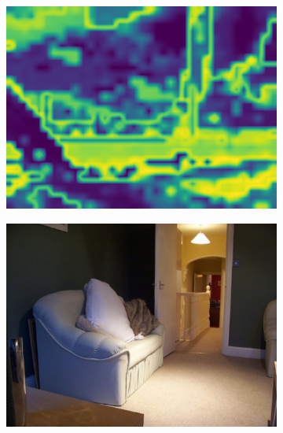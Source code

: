 \begin{figure}[t]
\begin{subfigure}{0.3\textwidth}
    \includegraphics[width=\linewidth]{figures/experiments/entropymaps/er/13/entropy_mapwithoutcb.png}
\end{subfigure}
\begin{subfigure}{0.3\textwidth}
    \centering
    \includegraphics[width=\linewidth]{figures/experiments/entropymaps/finetuned/10/0010.jpg}
\end{subfigure}
\begin{subfigure}{0.3\textwidth}
    \centering

\end{subfigure}
\end{figure}
